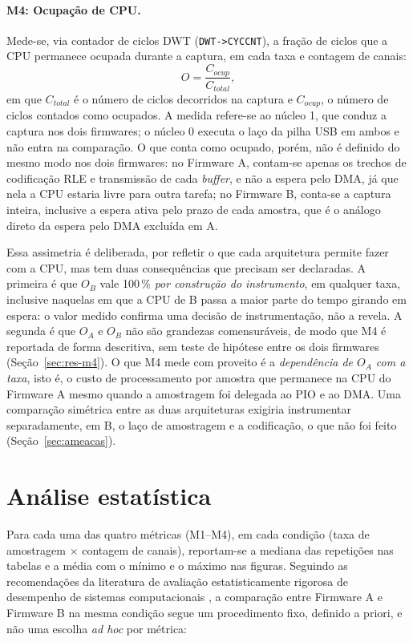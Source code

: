 \paragraph{M4: Ocupação de CPU.} Mede-se, via contador de ciclos \ac{DWT} (\texttt{DWT->CYCCNT}), a fração de ciclos
que a \ac{CPU} permanece ocupada durante a captura, em cada taxa e contagem de
canais:
\begin{equation}\label{eq:m4-ocupacao}
  O = \frac{C_{ocup}}{C_{total}},
\end{equation}
em que $C_{total}$ é o número de ciclos decorridos na captura e $C_{ocup}$, o
número de ciclos contados como ocupados. A medida refere-se ao núcleo 1, que
conduz a captura nos dois firmwares; o núcleo 0 executa o laço da pilha
\ac{USB} em ambos e não entra na comparação. O que conta como ocupado, porém, não
é definido do mesmo modo nos dois firmwares: no Firmware A, contam-se apenas
os trechos de codificação \ac{RLE} e transmissão de cada \emph{buffer}, e não
a espera pelo \ac{DMA}, já que nela a \ac{CPU} estaria livre para outra
tarefa; no Firmware B, conta-se a captura inteira, inclusive a espera ativa
pelo prazo de cada amostra, que é o análogo direto da espera pelo \ac{DMA}
excluída em A.

Essa assimetria é deliberada, por refletir o que cada arquitetura permite
fazer com a \ac{CPU}, mas tem duas consequências que precisam ser declaradas.
A primeira é que $O_B$ vale 100\,\% \emph{por construção do instrumento}, em
qualquer taxa, inclusive naquelas em que a \ac{CPU} de B passa a maior parte
do tempo girando em espera: o valor medido confirma uma decisão de
instrumentação, não a revela. A segunda é que $O_A$ e $O_B$ não são
grandezas comensuráveis, de modo que M4 é reportada de forma descritiva, sem
teste de hipótese entre os dois firmwares (Seção~\ref{sec:res-m4}). O que M4
mede com proveito é a \emph{dependência de $O_A$ com a taxa}, isto é, o custo
de processamento por amostra que permanece na \ac{CPU} do Firmware A mesmo
quando a amostragem foi delegada ao \ac{PIO} e ao \ac{DMA}. Uma comparação
simétrica entre as duas arquiteturas exigiria instrumentar separadamente, em
B, o laço de amostragem e a codificação, o que não foi feito
(Seção~\ref{sec:ameacas}).

\section{Análise estatística}\label{sec:analise-estatistica}

Para cada uma das quatro métricas (M1--M4), em cada condição (taxa de
amostragem $\times$ contagem de canais), reportam-se a mediana das
repetições nas tabelas e a média com o mínimo e o máximo nas figuras. Seguindo as recomendações da literatura de
avaliação estatisticamente rigorosa de desempenho de sistemas computacionais
\cite{georges2007,hoefler2015,fleming1986}, a comparação entre Firmware A e
Firmware B na mesma condição segue um procedimento fixo, definido a priori, e
não uma escolha \emph{ad hoc} por métrica:

